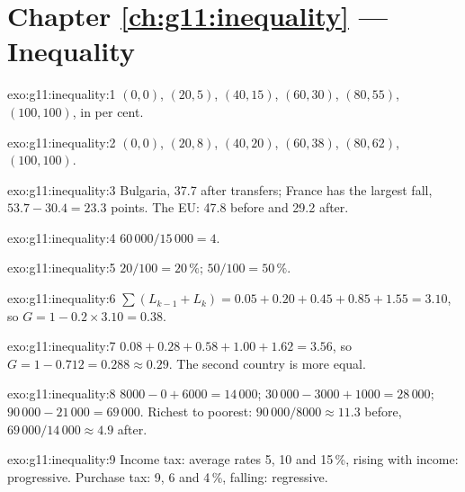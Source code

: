 \section*{Chapter \ref{ch:g11:inequality} --- Inequality}

\begin{solution}{exo:g11:inequality:1}
$(0, 0)$, $(20, 5)$, $(40, 15)$, $(60, 30)$, $(80, 55)$, $(100, 100)$, in per cent.
\end{solution}

\begin{solution}{exo:g11:inequality:2}
$(0, 0)$, $(20, 8)$, $(40, 20)$, $(60, 38)$, $(80, 62)$, $(100, 100)$.
\end{solution}

\begin{solution}{exo:g11:inequality:3}
Bulgaria, 37.7 after transfers; France has the largest fall, $53.7 - 30.4 = 23.3$ points. The EU: 47.8 before and 29.2 after.
\end{solution}

\begin{solution}{exo:g11:inequality:4}
$60\,000/15\,000 = 4$.
\end{solution}

\begin{solution}{exo:g11:inequality:5}
$20/100 = 20\,\%$; $50/100 = 50\,\%$.
\end{solution}

\begin{solution}{exo:g11:inequality:6}
$\sum (L_{k-1} + L_k) = 0.05 + 0.20 + 0.45 + 0.85 + 1.55 = 3.10$, so $G = 1 - 0.2 \times 3.10 = 0.38$.
\end{solution}

\begin{solution}{exo:g11:inequality:7}
$0.08 + 0.28 + 0.58 + 1.00 + 1.62 = 3.56$, so $G = 1 - 0.712 = 0.288 \approx 0.29$. The second country is more equal.
\end{solution}

\begin{solution}{exo:g11:inequality:8}
$8000 - 0 + 6000 = 14\,000$; $30\,000 - 3000 + 1000 = 28\,000$; $90\,000 - 21\,000 = 69\,000$. Richest to poorest: $90\,000/8000 \approx 11.3$ before, $69\,000/14\,000 \approx 4.9$
after.
\end{solution}

\begin{solution}{exo:g11:inequality:9}
Income tax: average rates 5, 10 and 15\,\%, rising with income: progressive. Purchase tax: 9, 6 and 4\,\%, falling: regressive.
\end{solution}

